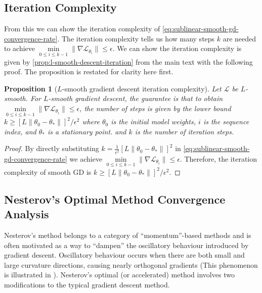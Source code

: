 \documentclass{article}
\theoremstyle{plain}
\newtheorem{proposition}[theorem]{Proposition}
\theoremstyle{definition}
\theoremstyle{remark}
\begin{document}
\subsection{Iteration Complexity}
From this we can show the iteration complexity of \cref{eq:sublinear-smooth-gd-convergence-rate}. The iteration complexity tells us how many steps $k$ are needed to achieve $\underset{0 \leq i \leq k-1}{\min} \|\nabla \mathcal{L}_{\theta_i}\| \leq \epsilon$. We can show the iteration complexity is given by \cref{prop:l-smooth-descent-iteration} from the main text with the following proof. The proposition is restated for clarity here first.
\begin{proposition}[$L$-smooth gradient descent iteration complexity]
\label{prop:l-smooth-descent-iteration-app}
Let $\mathcal{L}$ be $L$-smooth. For $L$-smooth gradient descent, the guarantee is that to obtain $\underset{0 \leq i \leq k-1}{\min} \|\nabla \mathcal{L}_{\theta_i}\| \le \epsilon$, the number of steps is given by the lower bound \(
 k \ge \left[ L\|\theta_0 - \theta_*\|  \right]^2/\epsilon^2
\) where $\theta_0$ is the initial model weights, $i$ is the sequence index, and $\theta_*$ is a stationary point. and $k$ is the number of iteration steps.
\end{proposition}

\begin{proof}
 By directly substituting $k = \frac{1}{\epsilon^2}\left[ L\|{\theta_0} - {\theta_*}\| \right]^2$ in \cref{eq:sublinear-smooth-gd-convergence-rate} we achieve $\underset{0 \leq i \leq k-1}{\min} \|\nabla \mathcal{L}_{\theta_i}\| \leq \epsilon$. Therefore, the iteration complexity of smooth GD is \(
 k \ge \left[ L\|\theta_0 - \theta_*\|  \right]^2/\epsilon^2
\).
    
\end{proof}

\subsection{Nesterov's Optimal Method Convergence Analysis}
\label{app:nesterov-convergence}

Nesterov's method belongs to a category of ``momentum''-based methods and is often motivated as a way to ``dampen'' the oscillatory behaviour introduced by gradient descent. Oscillatory behaviour occurs when there are both small and large curvature directions, causing nearly orthogonal gradients (This phenomenon is illustrated in \citealp{goh2017why}). Nesterov's optimal (or accelerated) method \citep{nesterov1983method} involves two modifications to the typical gradient descent method.
\end{document}
